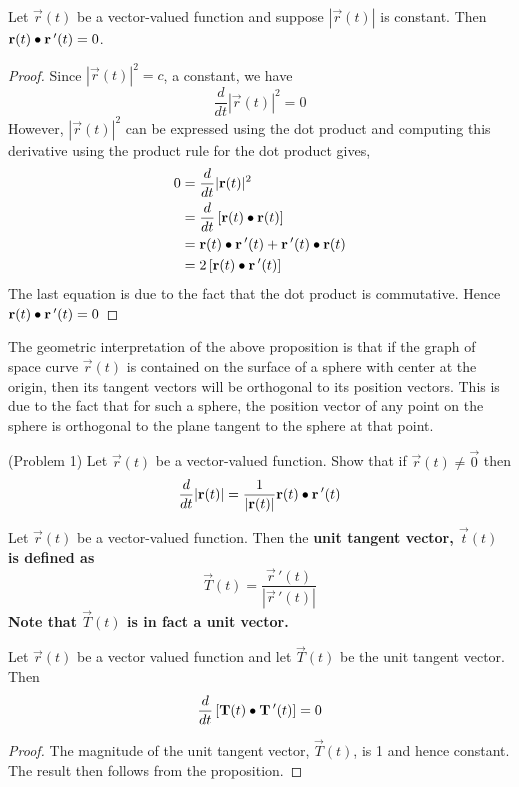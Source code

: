 \documentclass[handout]{ximera}
\begin{document}
\begin{proposition}
Let $\vec r(t)$ be a vector-valued function and suppose $|\vec r(t)|$ is constant. Then $\mathbf r(t) \bullet \mathbf r\,'(t) = 0$.\\
\end{proposition}
\begin{proof}
Since $|\vec r(t)|^2 = c$, a constant, we have
\[
\frac{d}{dt} |\vec r(t)|^2 = 0
\]
However, $|\vec r(t)|^2$ can be expressed using the dot product and computing this derivative using the product rule for the dot product gives,
\begin{align*}
0 &= \frac{d}{dt} |\mathbf r(t)|^2 \\
&= \frac{d}{dt} \left[\mathbf r(t) \bullet \mathbf r(t)\right] \\
  &= \mathbf r(t) \bullet \mathbf r\,'(t) + \mathbf r\,'(t) \bullet \mathbf r(t) \\
  &= 2 \left[\mathbf r(t) \bullet \mathbf r\,'(t)\right]
\end{align*}
The last equation is due to the fact that the dot product is commutative. Hence $\mathbf r(t) \bullet \mathbf r\,'(t) = 0$
\end{proof}

\begin{remark}
The geometric interpretation of the above proposition is that if the graph of space curve $\vec r(t)$ is contained 
on the surface of a sphere with center at the origin,
then its tangent vectors will be orthogonal to its position vectors.  
This is due to the fact that for such a sphere, the position vector of any point on the sphere is 
orthogonal to the plane tangent to the sphere at that point.
\end{remark}

\begin{problem}(Problem 1)
Let $\vec r(t)$ be a vector-valued function. Show that if $\vec r(t) \neq \vec 0$ then 
\[
\frac{d}{dt} |\mathbf r(t)| = \frac{1}{|\mathbf r(t)|} \mathbf r(t) \bullet \mathbf r\,'(t)
\]
\end{problem}

\begin{definition}
Let $\vec r(t)$ be a vector-valued function. Then the \bf{unit tangent vector}, $\vec t(t)$ is defined as
\[
\vec T(t) = \frac{\vec r\,'(t)}{|\vec r\,'(t)|}
\]
Note that $\vec T(t)$ is in fact a unit vector.
\end{definition}

\begin{corollary}
Let $\vec r(t)$ be a vector valued function and let $\vec T(t)$ be the unit tangent vector.
Then 
\[
\frac{d}{dt}\left[\mathbf T(t) \bullet \mathbf T\,'(t)\right] = 0
\]
\end{corollary}
\begin{proof}
The magnitude of the unit tangent vector, $\vec T(t)$, is 1 and hence constant. The result then follows from the proposition.
\end{proof}
\end{document}
